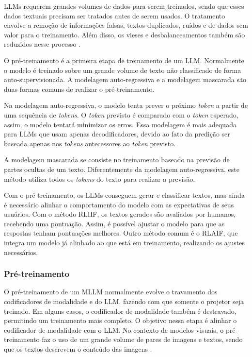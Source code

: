 \acp{LLM} requerem grandes volumes de dados para serem treinados, sendo que esses dados textuais precisam ser tratados
antes de serem usados. O tratamento envolve a remoção de informações falsas, textos duplicados, ruídos e de dados sem
valor para o treinamento. Além disso, os vieses e desbalanceamentos também são reduzidos nesse processo
\cite{llm_survey_2024}.


O pré-treinamento é a primeira etapa de treinamento de um \ac{LLM}. Normalmente o modelo é treinado sobre um grande
volume de texto não classificado de forma auto-supervisionada. A modelagem auto-regressiva e a modelagem mascarada são
duas formas comuns de realizar o pré-treinamento.

Na modelagem auto-regressiva, o modelo tenta prever o próximo \textit{token} a partir de uma sequência de
\textit{tokens}. O \textit{token} previsto é comparado com o \textit{token} esperado, assim, o modelo tentará minimizar
os erros. Essa modelagem é mais adequada para \acp{LLM} que usam apenas decodificadores, devido ao fato da predição ser
baseada apenas nos \textit{tokens} antecessores ao \textit{token} previsto.

A modelagem mascarada se consiste no treinamento baseado na previsão de partes ocultas de um texto. Diferentemente da
modelagem auto-regressiva, este método utiliza todos os \textit{tokens} do texto para realizar a previsão.

 \label{sec:alinhamento}

Com o pré-treinamento, os \acp{LLM} conseguem gerar e classificar textos, mas ainda é necessário alinhar o
comportamento do modelo com as expectativas de seus usuários. Com o método \ac{RLHF}, os textos gerados são avaliados
por humanos, recebendo uma pontuação. Assim, é possível ajustar o modelo para que as respostas tenham pontuações
melhores. Outro método comum é o \ac{RLAIF}, que integra um modelo já alinhado ao que está em treinamento, realizando
os ajustes necessários.

\subsubsection{Pré-treinamento}

O pré-treinamento de um \ac{MLLM} normalmente evolve o travamento dos codificadores de modalidade e do \ac{LLM},
fazendo com que somente o projetor seja treinado. Em alguns casos, o codificador de modalidade também é destravado,
permitindo um treinamento mais completo. O objetivo nessa etapa é alinhar o codificador de modalidade com o \ac{LLM}.
No contexto de modelos visuais, o pré-treinamento faz o uso de um grande volume de pares de imagens e textos, sendo que
os textos descrevem o conteúdo das imagens \cite{mllm_survey_2023}.

